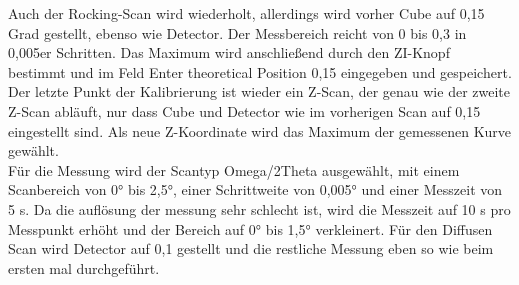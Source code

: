 Auch der Rocking-Scan wird wiederholt, allerdings wird vorher \glqq Cube\grqq{} auf 0,15 Grad gestellt, ebenso wie \glqq Detector\grqq{}.
Der Messbereich reicht von 0 bis 0,3 in 0,005er Schritten. Das Maximum wird anschließend durch den \glqq ZI\grqq{}-Knopf bestimmt 
und im Feld \glqq Enter theoretical Position\grqq{} 0,15 eingegeben und gespeichert.\\

Der letzte Punkt der Kalibrierung ist wieder ein Z-Scan, der genau wie der zweite Z-Scan abläuft, 
nur dass \glqq Cube\grqq{} und \glqq Detector\grqq{} wie im vorherigen Scan auf 0,15 eingestellt sind.
Als neue Z-Koordinate wird das Maximum der gemessenen Kurve gewählt.\\

Für die Messung wird der \glqq Scantyp\grqq{} \glqq Omega/2Theta\grqq{} ausgewählt, mit einem Scanbereich von 0° bis 2,5°, einer Schrittweite von 0,005° und einer 
Messzeit von 5 s. Da die auflösung der messung sehr schlecht ist, wird die Messzeit auf 10 s pro Messpunkt erhöht und der Bereich auf 0° bis 1,5° verkleinert.
Für den \glqq Diffusen Scan\grqq{} wird \glqq Detector\grqq{} auf 0,1 gestellt und die restliche Messung eben so wie beim ersten mal durchgeführt.



